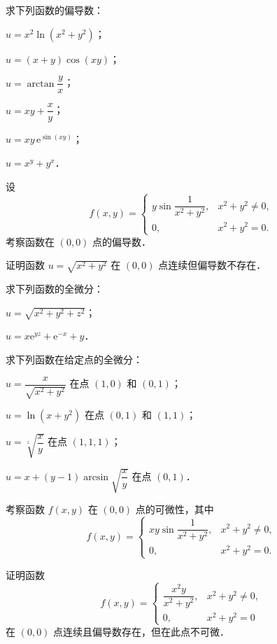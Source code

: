 \begin{xiti}
\item 求下列函数的偏导数：
\begin{ziti}
\item $u=x^{2}\ln(x^{2}+y^{2})$；
\item $u=(x+y)\cos(xy)$；
\item $u=\arctan\dfrac{y}{x}$；
\item $u=xy+\dfrac{x}{y}$；
\item $u=xy\,\mathrm{e}^{\sin(xy)}$；
\item $u=x^{y}+y^{x}$．
\end{ziti}
\item 设
\[
f(x,y)=\begin{cases}
y\sin\dfrac{1}{x^{2}+y^{2}}, & x^{2}+y^{2}\neq 0,\\
0, & x^{2}+y^{2}=0.
\end{cases}
\]
考察函数在 $(0,0)$ 点的偏导数．
\item 证明函数 $u=\sqrt{x^{2}+y^{2}}$ 在 $(0,0)$ 点连续但偏导数不存在．
\item 求下列函数的全微分：
\begin{ziti}
\item $u=\sqrt{x^{2}+y^{2}+z^{2}}$；
\item $u=x\mathrm{e}^{yz}+\mathrm{e}^{-x}+y$．
\end{ziti}
\item 求下列函数在给定点的全微分：
\begin{ziti}
\item $u=\dfrac{x}{\sqrt{x^{2}+y^{2}}}$ 在点 $(1,0)$ 和 $(0,1)$；
\item $u=\ln(x+y^{2})$ 在点 $(0,1)$ 和 $(1,1)$；
\item $u=\sqrt[z]{\dfrac{x}{y}}$ 在点 $(1,1,1)$；
\item $u=x+(y-1)\arcsin\sqrt{\dfrac{x}{y}}$ 在点 $(0,1)$．
\end{ziti}
\item 考察函数 $f(x,y)$ 在 $(0,0)$ 点的可微性，其中
\[
f(x,y)=\begin{cases}
xy\sin\dfrac{1}{x^{2}+y^{2}}, & x^{2}+y^{2}\neq 0,\\
0, & x^{2}+y^{2}=0.
\end{cases}
\]
\item 证明函数
\[
f(x,y)=\begin{cases}
\dfrac{x^{2}y}{x^{2}+y^{2}}, & x^{2}+y^{2}\neq 0,\\
0, & x^{2}+y^{2}=0
\end{cases}
\]
在 $(0,0)$ 点连续且偏导数存在，但在此点不可微．

\end{xiti}
